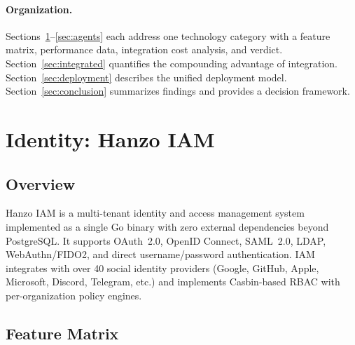 \documentclass[11pt,twocolumn]{article}
\begin{document}
\paragraph{Organization.} Sections~\ref{sec:identity}--\ref{sec:agents} each address one technology category with a feature matrix, performance data, integration cost analysis, and verdict. Section~\ref{sec:integrated} quantifies the compounding advantage of integration. Section~\ref{sec:deployment} describes the unified deployment model. Section~\ref{sec:conclusion} summarizes findings and provides a decision framework.

\section{Identity: Hanzo IAM}
\label{sec:identity}

\subsection{Overview}

Hanzo IAM is a multi-tenant identity and access management system implemented as a single Go binary with zero external dependencies beyond PostgreSQL. It supports OAuth~2.0, OpenID Connect, SAML~2.0, LDAP, WebAuthn/FIDO2, and direct username/password authentication. IAM integrates with over 40 social identity providers (Google, GitHub, Apple, Microsoft, Discord, Telegram, etc.) and implements Casbin-based RBAC with per-organization policy engines.

\subsection{Feature Matrix}
\end{document}
